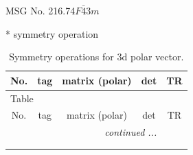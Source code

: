 \documentclass[fleqn,8pt]{jsarticle}
\begin{document}
\setcounter{MaxMatrixCols}{32}

\renewcommand{\tablename}{Table~}
\renewcommand{\figurename}{Figure~}
\begin{center}
\LARGE
MSG No. 216.74\quad$F\bar{4}3m$
\end{center}
* symmetry operation
\renewcommand{\arraystretch}{1.3}
\begin{longtable}{ccccc}
\caption{Symmetry operations for 3d polar vector.}
 \\
 \hline \hline
No. & tag & matrix (polar) & det & TR \\ \hline \endfirsthead

\multicolumn{4}{l}{\tablename\ \thetable{}} \\
 \hline \hline
No. & tag & matrix (polar) & det & TR \\ \hline \endhead

 \hline \hline
\multicolumn{4}{r}{\footnotesize\it continued ...} \\ \endfoot

 \hline \hline
\multicolumn{4}{r}{} \\ \endlastfoot


\end{longtable}
\end{document}
